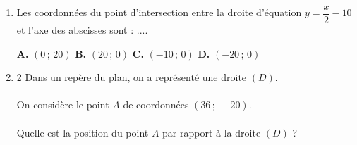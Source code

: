 \documentclass[a4paper,11pt]{article}
\begin{document}
\begin{seanceD}{} %

\begin{enumerate}
\item Les coordonnées du point d'intersection
    entre la droite d'équation $y=\dfrac{x}{2}-10$ et l'axe des abscisses sont :  ....

\medskip
\begin{center}
\textbf{\textcolor{Couleur1}{A.}} $(0\,;\,20)$ \qquad \textbf{\textcolor{Couleur1}{B.}} $(20\,;\,0)$ \qquad \textbf{\textcolor{Couleur1}{C.}} $(-10\,;\,0)$ \qquad \textbf{\textcolor{Couleur1}{D.}} $(-20\,;\,0)$
\end{center}


\item \begin{multicols}{2}
    Dans un repère du plan, on a représenté une droite $(D)$.\\
\\      On considère le point $A$ de coordonnées $(36\,;\,-20)$.\\
\\      Quelle est la position du point $A$ par rapport à la droite $(D)$ ?

    \begin{tikzpicture}[baseline,scale = 0.5]


\end{tikzpicture}
\end{multicols}
\end{enumerate}
\end{seanceD}
\end{document}
